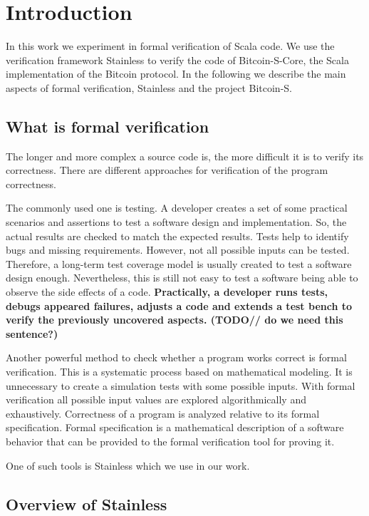 \chapter{Introduction}
\label{chap:introduction}
In this work we experiment in formal verification of Scala code. 
We use the verification framework Stainless to verify the code of Bitcoin-S-Core, the Scala implementation of the Bitcoin protocol.
In the following we describe the main aspects of formal verification, Stainless and the project Bitcoin-S.


\section{What is formal verification}
\label{sec:formal_verification}

The longer and more complex a source code is, the more difficult it is to verify its correctness.
There are different approaches for verification of the program correctness. 

The commonly used one is testing.
A developer creates a set of some practical scenarios and assertions to test a software design and implementation. 
So, the actual results are checked to match the expected results.
Tests help to identify bugs and missing requirements.
However, not all possible inputs can be tested. 
Therefore, a long-term test coverage model is usually created to test a software design enough.
Nevertheless, this is still not easy to test a software being able to observe the side effects of a code.
\textbf{Practically, a developer runs tests, debugs appeared failures, adjusts a code and extends a test bench to verify the previously uncovered aspects. (TODO// do we need this sentence?)}\cite{sanghavi:formal_verification}

Another powerful method to check whether a program works correct is formal verification. 
This is a systematic process based on mathematical modeling. 
It is unnecessary to create a simulation tests with some possible inputs. 
With formal verification all possible input values are explored algorithmically and exhaustively.
Correctness of a program is analyzed relative to its formal specification.
Formal specification is a mathematical description of a software behavior that can be provided to the formal verification tool for proving it.\cite{sanghavi:formal_verification}

One of such tools is Stainless which we use in our work.


\section{Overview of Stainless}
\label{sec:stainless}


